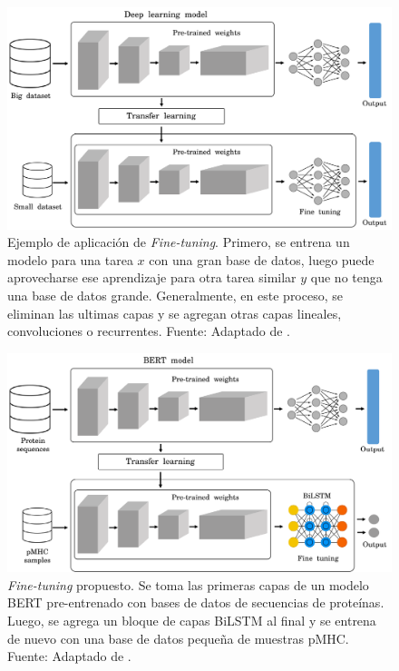  



\begin{figure}[H]
	\centering
	\includegraphics[width=\textwidth]{../img/proposal/fine_tuning}	
	\caption[Ejemplo de aplicación de \textit{Fine-tuning}]{Ejemplo de aplicación de \textit{Fine-tuning}. Primero, se entrena un modelo para una tarea $x$ con una gran base de datos, luego puede aprovecharse ese aprendizaje para otra tarea similar $y$ que no tenga una base de datos grande. Generalmente, en este proceso, se eliminan las ultimas capas y se agregan otras capas lineales, convoluciones o recurrentes. Fuente: Adaptado de  \cite{prince2023understanding}.}		
	\label{fig:fine-tuning}
\end{figure}


\begin{figure}[H]
	\centering
	\includegraphics[width=\textwidth]{../img/proposal/fine_tuning_proposal}	
	\caption[Fine-tuning al modelo BERT]{\textit{Fine-tuning} propuesto. Se toma las primeras capas de un modelo BERT pre-entrenado con bases de datos de secuencias de proteínas. Luego, se agrega un bloque de capas BiLSTM al final y se entrena de nuevo con una base de datos pequeña de muestras pMHC. Fuente: Adaptado de  \cite{prince2023understanding}.}		
	\label{fig:fine-tuning_proposal}
\end{figure}




